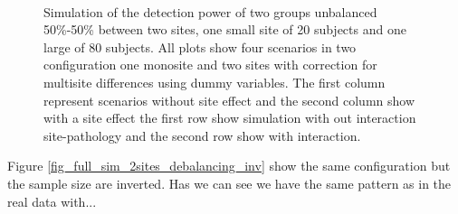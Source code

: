 \documentclass[authoryear]{elsarticle}
\begin{document}
\begin{figure}[t]
     \\
     \tiny Simulation of the detection power of two groups unbalanced 50\%-50\% between two sites, one small site of 20 subjects and one large of 80 subjects. All plots show four scenarios in two configuration one monosite and two sites with correction for multisite differences using dummy variables. The first column represent scenarios without site effect and the second column show with a site effect the first row show simulation with out interaction site-pathology and the second row show with interaction.
     \label{fig_full_sim_2sites_balanced}
 \end{figure}
 
Figure \ref{fig_full_sim_2sites_debalancing_inv} show the same configuration but the sample size are inverted. Has we can see we have the same pattern as in the real data with...
\end{document}
